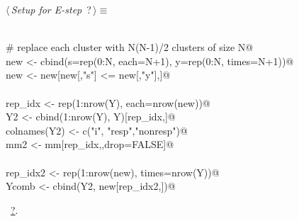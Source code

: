 \documentclass[reqno]{amsart}
\renewcommand{\NWtarget}[2]{\hypertarget{#1}{#2}}
\renewcommand{\NWlink}[2]{\hyperlink{#1}{#2}}
\begin{document}
\begin{flushleft} \small\label{scrap9}\raggedright\small
\NWtarget{nuweb?}{} $\langle\,${\itshape Setup for E-step}\nobreak\ {\footnotesize {?}}$\,\rangle\equiv$
\vspace{-1ex}
\begin{list}{}{} \item
\mbox{}\verb@@\\
\mbox{}\verb@    # replace each cluster with N(N-1)/2 clusters of size N@\\
\mbox{}\verb@    new <- cbind(s=rep(0:N, each=N+1), y=rep(0:N, times=N+1))@\\
\mbox{}\verb@    new <- new[new[,"s"] <= new[,"y"],]@\\
\mbox{}\verb@@\\
\mbox{}\verb@    rep_idx <- rep(1:nrow(Y), each=nrow(new))@\\
\mbox{}\verb@    Y2 <- cbind(1:nrow(Y), Y)[rep_idx,]@\\
\mbox{}\verb@    colnames(Y2) <- c("i", "resp","nonresp")@\\
\mbox{}\verb@    mm2 <- mm[rep_idx,,drop=FALSE]@\\
\mbox{}\verb@@\\
\mbox{}\verb@    rep_idx2 <- rep(1:nrow(new), times=nrow(Y))@\\
\mbox{}\verb@    Ycomb <- cbind(Y2, new[rep_idx2,])@\\
\mbox{}\verb@@{\NWsep}
\end{list}
\vspace{-1.5ex}
\footnotesize
\begin{list}{}{\setlength{\itemsep}{-\parsep}\setlength{\itemindent}{-\leftmargin}}
\item \NWtxtMacroRefIn\ \NWlink{nuweb?}{?}.

\item{}
\end{list}
\vspace{4ex}
\end{flushleft}
\end{document}
